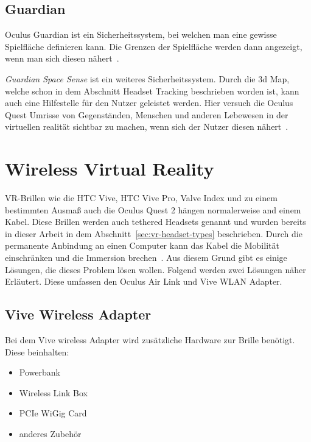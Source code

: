 \subsection{Guardian}

Oculus Guardian ist ein Sicherheitssystem, bei welchen man eine gewisse Spielfläche definieren kann.
Die Grenzen der Spielfläche werden dann angezeigt, wenn man sich diesen nähert~\cite{Oculus_Guardien}.

\emph{Guardian Space Sense} ist ein weiteres Sicherheitssystem.
Durch die 3d Map, welche schon in dem Abschnitt Headset Tracking beschrieben worden ist, kann auch eine Hilfestelle für den Nutzer geleistet werden.
Hier versuch die Oculus Quest Umrisse von Gegenständen, Menschen und anderen Lebewesen in der virtuellen realität sichtbar zu machen, wenn sich der Nutzer diesen nähert~\cite{Oculus_Guardien}.

\section{Wireless Virtual Reality}
\label{subsec:wireless-virtual-reality}

VR-Brillen wie die HTC Vive, HTC Vive Pro, Valve Index und zu einem bestimmten Ausmaß auch die Oculus Quest 2 hängen normalerweise and einem Kabel.
Diese Brillen werden auch tethered Headsets genannt und wurden bereits in dieser Arbeit in dem Abschnitt~\ref{sec:vr-headset-types} beschrieben.
Durch die permanente Anbindung an einen Computer kann das Kabel die Mobilität einschränken und die Immersion brechen~\cite{Oculus_2021}.
Aus diesem Grund gibt es einige Lösungen, die dieses Problem lösen wollen.
Folgend werden zwei Lösungen näher Erläutert.
Diese umfassen den Oculus Air Link und Vive WLAN Adapter.

\subsection{Vive Wireless Adapter}

Bei dem Vive wireless Adapter wird zusätzliche Hardware zur Brille benötigt.
Diese beinhalten:

\begin{itemize}
    \item Powerbank
    \item Wireless Link Box
    \item PCIe WiGig Card
    \item anderes Zubehör
\end{itemize}

